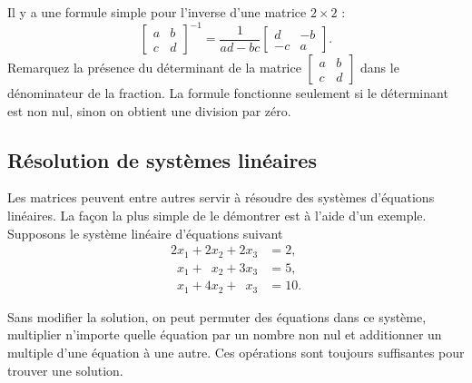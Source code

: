 Il y a une formule simple pour l'inverse d'une matrice $2 \times 2$ :
\begin{equation*}
\begin{bmatrix}
a & b \\
c & d
\end{bmatrix}^{-1}
=
\frac{1}{ad-bc}
\begin{bmatrix}
d & -b \\
-c & a
\end{bmatrix} .
\end{equation*}
Remarquez la présence du déterminant de la matrice 
$[\begin{smallmatrix}a&b\\c&d\end{smallmatrix}]$
dans le dénominateur de la fraction. La formule fonctionne seulement si le déterminant est non nul, sinon on obtient une division par zéro.

\subsection{Résolution de systèmes linéaires}

Les matrices peuvent entre autres servir à résoudre des systèmes d'équations linéaires. La façon la plus simple de le démontrer est à l'aide d'un exemple. Supposons le système linéaire d’équations suivant
\begin{align*}
          2 x_1 +           2 x_2 +           2 x_3 & = 2 , \\
\phantom{9} x_1 + \phantom{9} x_2 +           3 x_3 & = 5 , \\
\phantom{9} x_1 +           4 x_2 + \phantom{9} x_3 & = 10 .
\end{align*}

Sans modifier la solution, on peut permuter des équations dans ce système, multiplier n’importe quelle équation par un nombre non nul et additionner un multiple d’une équation à une autre. Ces opérations sont toujours suffisantes pour trouver une solution.

